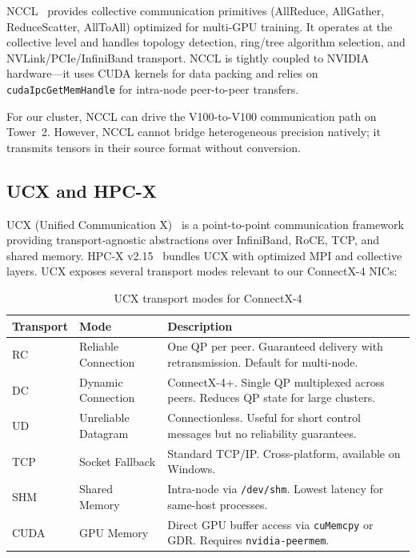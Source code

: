 \documentclass[11pt,letterpaper]{article}
\theoremstyle{definition}
\begin{document}
NCCL~\cite{nccl} provides collective communication primitives (AllReduce, AllGather, ReduceScatter, AllToAll) optimized for multi-GPU training. It operates at the collective level and handles topology detection, ring/tree algorithm selection, and NVLink/PCIe/InfiniBand transport. NCCL is tightly coupled to NVIDIA hardware---it uses CUDA kernels for data packing and relies on \texttt{cudaIpcGetMemHandle} for intra-node peer-to-peer transfers.

For our cluster, NCCL can drive the V100-to-V100 communication path on Tower~2. However, NCCL cannot bridge heterogeneous precision natively; it transmits tensors in their source format without conversion.

\subsection{UCX and HPC-X}

UCX (Unified Communication X)~\cite{ucx} is a point-to-point communication framework providing transport-agnostic abstractions over InfiniBand, RoCE, TCP, and shared memory. HPC-X v2.15~\cite{hpcx} bundles UCX with optimized MPI and collective layers. UCX exposes several transport modes relevant to our ConnectX-4 NICs:

\begin{table}[htbp]
\centering
\caption{UCX transport modes for ConnectX-4}
\label{tab:ucx-transports}
\begin{tabular}{@{}llp{7.5cm}@{}}
\toprule
\textbf{Transport} & \textbf{Mode} & \textbf{Description} \\
\midrule
RC & Reliable Connection & One QP per peer. Guaranteed delivery with retransmission. Default for multi-node. \\
DC & Dynamic Connection & ConnectX-4+. Single QP multiplexed across peers. Reduces QP state for large clusters. \\
UD & Unreliable Datagram & Connectionless. Useful for short control messages but no reliability guarantees. \\
TCP & Socket Fallback & Standard TCP/IP. Cross-platform, available on Windows. \\
SHM & Shared Memory & Intra-node via \texttt{/dev/shm}. Lowest latency for same-host processes. \\
CUDA & GPU Memory & Direct GPU buffer access via \texttt{cuMemcpy} or GDR. Requires \texttt{nvidia-peermem}. \\
\bottomrule
\end{tabular}
\end{table}
\end{document}
